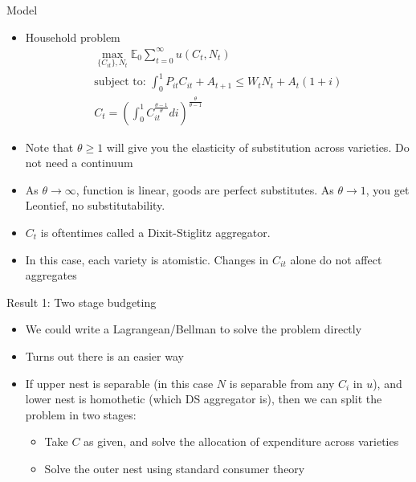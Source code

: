 \documentclass[11pt,aspectratio=169,xcolor={dvipsnames},hyperref={pdftex,pdfpagemode=UseNone,hidelinks,pdfdisplaydoctitle=true},usepdftitle=false]{beamer}
\begin{document}
\begin{frame}{Model}
\begin{itemize}
\item Household problem
\begin{align*}
\max_{\{C_{it}\},N_t } \mathbb{E}_0 \sum_{t=0}^{\infty} u(C_t,N_t)\\
\text{subject to:   } \int_0^1 P_{it} C_{it} + A_{t+1} \leq W_t N_t +  A_t(1+i)\\
C_t = \left(\int_0^1 C^{\frac{\theta-1}{\theta}}_{it} di \right)^{\frac{\theta}{\theta-1}}
\end{align*}
\item Note that $\theta \geq 1$ will give you the elasticity of substitution across varieties. Do not need a continuum
\item As $\theta \rightarrow \infty$, function is linear, goods are perfect substitutes. As $\theta \rightarrow 1$, you get Leontief, no substitutability.
\item $C_t$ is oftentimes called a Dixit-Stiglitz aggregator. 
\item In this case, each variety is atomistic. Changes in $C_{it}$ alone do not affect aggregates
\end{itemize}
\end{frame}


\begin{frame}{Result 1: Two stage budgeting}
\begin{itemize}
\item We could write a Lagrangean/Bellman to solve the problem directly
\item Turns out there is an easier way
\item If upper nest is separable (in this case $N$ is separable from any $C_{i}$ in $u$), and lower nest is homothetic (which DS aggregator is), then we can split the problem in two stages:
\begin{itemize}
\item Take $C$ as given, and solve the allocation of expenditure across varieties
\item Solve the outer nest using standard consumer theory
\end{itemize}
\end{itemize}
\end{frame}
\end{document}
